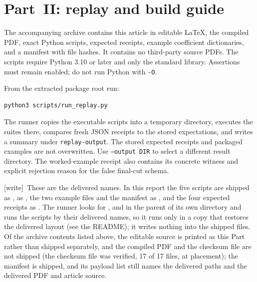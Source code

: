 \documentclass[11pt,letterpaper]{article}
\numberwithin{equation}{section}
\theoremstyle{definition}
\theoremstyle{remark}
\newcommand{\wtag}{\textup{[write]}}
\begin{document}
\section{Part~II: replay and build guide}\label{smc:sd:app:replay}
The accompanying archive contains this article in editable LaTeX, the compiled PDF, exact Python scripts, expected receipts, example coefficient dictionaries, and a manifest with file hashes. It contains no third-party source PDFs. The scripts require Python 3.10 or later and only the standard library. Assertions must remain enabled; do not run Python with \texttt{-O}.

From the extracted package root run:
\begin{verbatim}
python3 scripts/run_replay.py
\end{verbatim}
The runner copies the executable scripts into a temporary directory, executes the suites there, compares fresh JSON receipts to the stored expectations, and writes a summary under \texttt{replay-output}. The stored expected receipts and packaged examples are not overwritten. Use \texttt{--output DIR} to select a different result directory. The worked-example receipt also contains its concrete witness and explicit rejection reason for the false final-cut schema.


\wtag\ These are the delivered names. In this report the five scripts are shipped as ,  as , the two example files and the manifest as , and the four expected receipts as . The runner looks for ,  and  in the parent of its own directory and runs the scripts by their delivered names, so it runs only in a copy that restores the delivered layout (see the README); it writes nothing into the shipped files. Of the archive contents listed above, the editable source is printed as this Part rather than shipped separately, and the compiled PDF and the checksum file  are not shipped (the checksum file was verified, 17 of 17 files, at placement); the manifest is shipped, and its payload list still names the delivered paths and the delivered PDF and article source.
\end{document}
